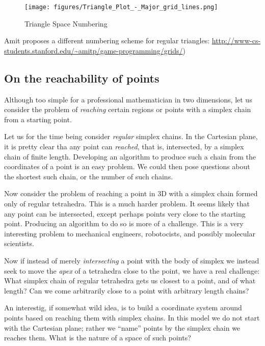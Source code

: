\documentclass[11pt]{article}
\begin{document}
\begin{figure}
     \centering
     \texttt{[image: figures/Triangle\_Plot\_-\_Major\_grid\_lines.png]}
     \caption{Triangle Space Numbering}
  \label{fig:equitetrabeam}
\end{figure}

\begin{footnote} Amit proposes a different numbering scheme for regular triangles:
  \url{http://www-cs-students.stanford.edu/~amitp/game-programming/grids/})
  \end{footnote}



\subsection{On the reachability of points}

Although too simple for a professional mathematician in two dimensions, let us consider the problem of {\em reaching} certain regions
or points with a simplex chain from a starting point.

Let us for the time being consider {\em regular} simplex chains.  In the Cartesian plane, it is pretty clear tha any point can {\em reached},
that is, intersected, by a simplex chain of finite length. Developing an algorithm to produce such a chain from the coordinates of a point
is an easy problem. We could then pose questions about the shortest such chain, or the number of such chains.

Now consider the problem of reaching a point in 3D with a simplex chain formed only of regular tetrahedra. This is a much harder problem.
It seems likely that any point can be intersected, except perhaps points very close to the starting point. Producing an algorithm to do so
is more of a challenge. This is a very interesting problem to mechanical engineers, robotocists, and possibly molecular scientists.

Now if instead of merely {\em intersecting} a point with the body of simplex we instead seek to move the {\em apex} of a tetrahedra close
to the point, we have a real challenge: What simplex chain of regular tetrahedra gets us closest to a point, and of what length? Can
we come arbitrarily close to a point with arbitrary length chains?

An interestig, if somewhat wild idea, is to build a coordinate system around points based on reaching them with simplex chains. In this model
we do not start with the Cartesian plane; rather we ``name'' points by the simplex chain we reaches them. What is the nature of a space
of such points? 
\end{document}
